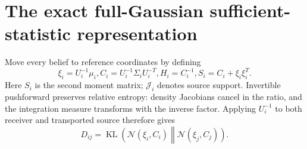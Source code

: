 \documentclass[11pt]{article}
\newcommand{\KL}{\operatorname{KL}}
\begin{document}
\section{The exact full-Gaussian sufficient-statistic representation}
\label{sec:lift}
Move every belief to reference coordinates by defining
\begin{equation}
\xi_i=U_i^{-1}\mu_i,
C_i=U_i^{-1}\Sigma_iU_i^{-T},
H_i=C_i^{-1}, S_i=C_i+\xi_i\xi_i^T.
\label{eq:common-frame}
\end{equation}
Here $S_i$ is the second moment matrix; $\mathcal J_i$ denotes source support. Invertible pushforward preserves relative entropy: density Jacobians cancel in the ratio, and the integration measure transforms with the inverse factor. Applying $U_i^{-1}$ to both receiver and transported source therefore gives
\begin{equation}
D_{ij}=\KL\left(\mathcal N(\xi_i,C_i)\middle\|\mathcal N(\xi_j,C_j)\right).
\label{eq:common-kl}
\end{equation}
\end{document}

